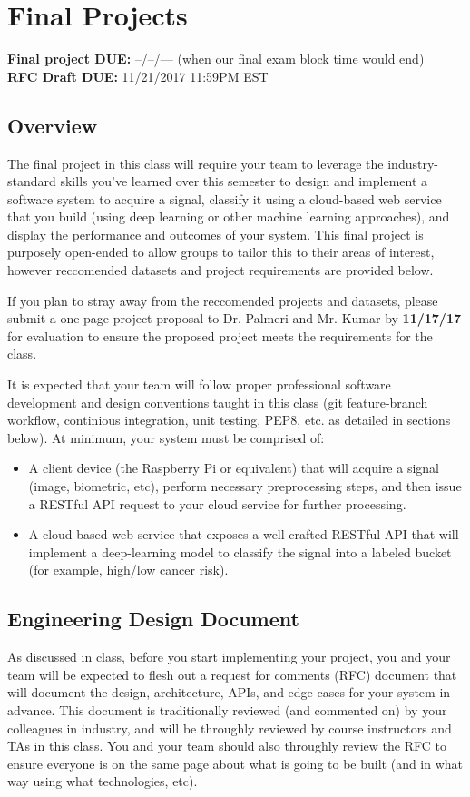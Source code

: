 
\usepackage{hyperref}



\section*{Final Projects}
{\bf Final project DUE:} --/--/--- (when our final exam block time would end) \\
{\bf RFC Draft DUE:} 11/21/2017 11:59PM EST 

\subsection*{Overview}
The final project in this class will require your team to leverage the industry-standard skills you've learned over this semester to design and implement a software system to acquire a signal, classify it using a cloud-based web service that you build (using deep learning or other machine learning approaches), and display the performance and outcomes of your system. This final project is purposely open-ended to allow groups to tailor this to their areas of interest, however reccomended datasets and project requirements are provided below. 

If you plan to stray away from the reccomended projects and datasets, please submit a one-page project proposal to Dr. Palmeri and Mr. Kumar by {\bf 11/17/17} for evaluation to ensure the proposed project meets the requirements for the class.

It is expected that your team will follow proper professional software development and design conventions taught in this class (git feature-branch workflow, continious integration, unit testing, PEP8, etc. as detailed in sections below). At minimum, your system must be comprised of:

\begin{itemize}
	\item A client device (the Raspberry Pi or equivalent) that will acquire a signal (image, biometric, etc), perform necessary preprocessing steps, and then issue a RESTful API request to your cloud service for further processing.
	\item A cloud-based web service that exposes a well-crafted RESTful API that will implement a deep-learning model to classify the signal into a labeled bucket (for example, high/low cancer risk).
\end{itemize}

\subsection*{Engineering Design Document}
As discussed in class, before you start implementing your project, you and your team will be expected to flesh out a request for comments (RFC) document that will document the design, architecture, APIs, and edge cases for your system in advance. This document is traditionally reviewed (and commented on) by your colleagues in industry, and will be throughly reviewed by course instructors and TAs in this class. You and your team should also throughly review the RFC to ensure everyone is on the same page about what is going to be built (and in what way using what technologies, etc). 

